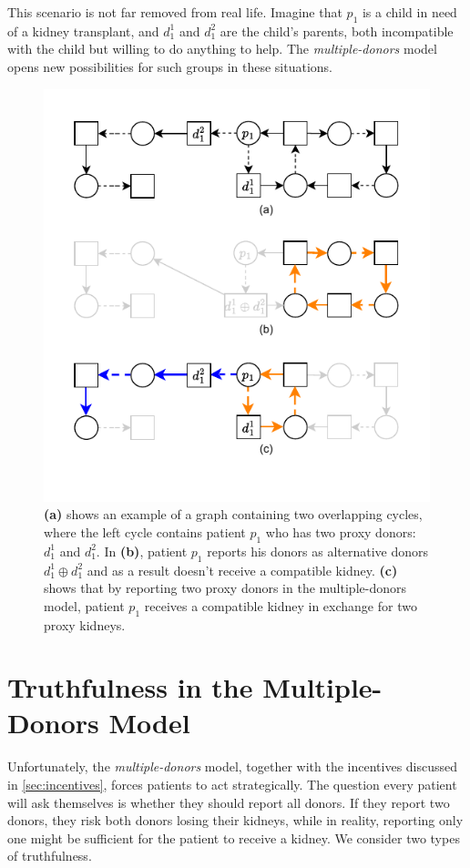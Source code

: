 This scenario is not far removed from real life. Imagine that $p_1$ is a child in need of a kidney transplant, and $d_1^1$ and $d_1^2$ are the child’s parents, both incompatible with the child but willing to do anything to help. The \textit{multiple-donors} model opens new possibilities for such groups in these situations.

\begin{figure}
    \centering
    \includegraphics{data/incentive_motivation_example2.pdf}
    \caption[An example showing the benefit of reporting two proxy donors in the multiple-donors model]{\textbf{(a)} shows an example of a graph containing two overlapping cycles, where the left cycle contains patient $p_1$ who has two proxy donors: $d_1^1$ and $d_1^2$. In \textbf{(b)}, patient $p_1$ reports his donors as alternative donors $d_1^1 \oplus d_1^2$ and as a result doesn't receive a compatible kidney. \textbf{(c)} shows that by reporting two proxy donors in the multiple-donors model, patient $p_1$ receives a compatible kidney in exchange for two proxy kidneys.}
    \label{fig:incentive_motivation_example2}
\end{figure}

\section{Truthfulness in the Multiple-Donors Model}
Unfortunately, the \textit{multiple-donors} model, together with the incentives discussed in \autoref{sec:incentives}, forces patients to act strategically. The question every patient will ask themselves is whether they should report all donors. If they report two donors, they risk both donors losing their kidneys, while in reality, reporting only one might be sufficient for the patient to receive a kidney. We consider two types of truthfulness.

